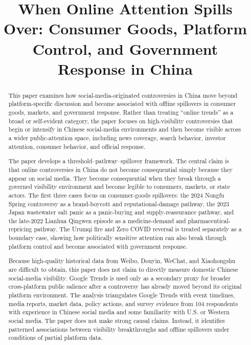 \documentclass[conference]{IEEEtran}
\title{When Online Attention Spills Over: Consumer Goods, Platform Control, and Government Response in China}
\author{
\IEEEauthorblockN{Hanyu Xie}
\IEEEauthorblockA{
Columbia University \\
 hx2413@columbia.edu
}
\and
\IEEEauthorblockN{Haotian Lei}
\IEEEauthorblockA{
Columbia University \\
 hl3945@columbia.edu
}
}
\begin{document}
\maketitle

\begin{abstract}
This paper examines how social-media-originated controversies in China move beyond platform-specific discussion and become associated with offline spillovers in consumer goods, markets, and government response. Rather than treating ``online trends'' as a broad or self-evident category, the paper focuses on high-visibility controversies that begin or intensify in Chinese social-media environments and then become visible across a wider public-attention space, including news coverage, search behavior, investor attention, consumer behavior, and official response.

The paper develops a threshold--pathway--spillover framework. The central claim is that online controversies in China do not become consequential simply because they appear on social media. They become consequential when they break through a governed visibility environment and become legible to consumers, markets, or state actors. The first three cases focus on consumer-goods spillovers: the 2024 Nongfu Spring controversy as a brand-boycott and reputational-damage pathway, the 2023 Japan wastewater salt panic as a panic-buying and supply-reassurance pathway, and the late-2022 Lianhua Qingwen episode as a medicine-demand and pharmaceutical-repricing pathway. The Urumqi fire and Zero COVID reversal is treated separately as a boundary case, showing how politically sensitive attention can also break through platform control and become associated with government response.

Because high-quality historical data from Weibo, Douyin, WeChat, and Xiaohongshu are difficult to obtain, this paper does not claim to directly measure domestic Chinese social-media visibility. Google Trends is used only as a secondary proxy for broader cross-platform public salience after a controversy has already moved beyond its original platform environment. The analysis triangulates Google Trends with event timelines, media reports, market data, policy actions, and survey evidence from 104 respondents with experience in Chinese social media and some familiarity with U.S. or Western social media. The paper does not make strong causal claims. Instead, it identifies patterned associations between visibility breakthroughs and offline spillovers under conditions of partial platform data.
\end{abstract}
\end{document}

